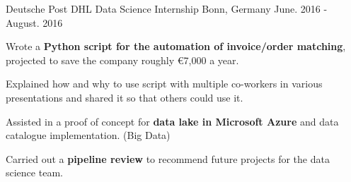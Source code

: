 

\begin{cventries}

  \cventry
    {Deutsche Post DHL} %
    {Data Science Internship} %
    {Bonn, Germany} %
    {June. 2016 - August. 2016} %
    {
      \begin{cvitems} %
        \item Wrote a {\textbf{Python script for the automation of invoice/order matching}, projected to save the company roughly €7,000 a year.}
        \item{Explained how and why to use script with multiple co-workers in various presentations and shared it so that others could use it.}
        \item{Assisted in a proof of concept for \textbf{data lake in Microsoft Azure} and data catalogue implementation. (Big Data)}
        \item{Carried out a \textbf{pipeline review} to recommend future projects for the data science team.}
      \end{cvitems}
    }

\end{cventries}
